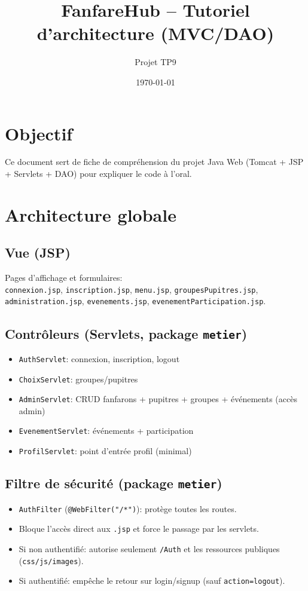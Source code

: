 ﻿\documentclass[11pt,a4paper]{article}
\title{FanfareHub -- Tutoriel d'architecture (MVC/DAO)}
\author{Projet TP9}
\date{\today}
\begin{document}
\maketitle

\section{Objectif}
Ce document sert de fiche de compréhension du projet Java Web (Tomcat + JSP + Servlets + DAO) pour expliquer le code à l'oral.

\section{Architecture globale}
\subsection*{Vue (JSP)}
Pages d'affichage et formulaires:\\
\texttt{connexion.jsp}, \texttt{inscription.jsp}, \texttt{menu.jsp}, \texttt{groupesPupitres.jsp}, \texttt{administration.jsp}, \texttt{evenements.jsp}, \texttt{evenementParticipation.jsp}.

\subsection*{Contrôleurs (Servlets, package \texttt{metier})}
\begin{itemize}
  \item \texttt{AuthServlet}: connexion, inscription, logout
  \item \texttt{ChoixServlet}: groupes/pupitres
  \item \texttt{AdminServlet}: CRUD fanfarons + pupitres + groupes + événements (accès admin)
  \item \texttt{EvenementServlet}: événements + participation
  \item \texttt{ProfilServlet}: point d'entrée profil (minimal)
\end{itemize}
\subsection*{Filtre de sécurité (package \texttt{metier})}
\begin{itemize}
  \item \texttt{AuthFilter} (\texttt{@WebFilter("/*")}): protège toutes les routes.
  \item Bloque l'accès direct aux \texttt{.jsp} et force le passage par les servlets.
  \item Si non authentifié: autorise seulement \texttt{/Auth} et les ressources publiques (\texttt{css/js/images}).
  \item Si authentifié: empêche le retour sur login/signup (sauf \texttt{action=logout}).
\end{itemize}
\end{document}
